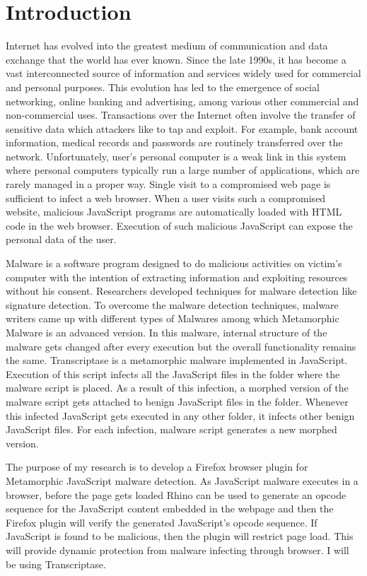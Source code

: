 \chapter{Introduction}

Internet has evolved into the greatest medium of communication and data exchange that the world has ever known. Since the late 1990s, it has become a vast interconnected source of information and services widely used for commercial and personal purposes. This evolution has led to the emergence of social networking, online banking and advertising, among various other commercial and non-commercial uses. Transactions over the Internet often involve the transfer of sensitive data which attackers like to tap and exploit. For example, bank account information, medical records and passwords are routinely transferred over the network. Unfortunately, user's personal computer is a weak link in this system where personal computers typically run a large number of applications, which are rarely managed in a proper way. Single visit to a compromised web page is sufficient to infect a web browser. When a user visits such a compromised website, malicious JavaScript programs are automatically loaded with HTML code in the web browser. Execution of such malicious JavaScript can expose the personal data of the user. 

Malware is a software program designed to do malicious activities on victim's computer with the intention of extracting information and exploiting resources without his consent. Researchers developed techniques for malware detection like signature detection. To overcome the malware detection techniques, malware writers came up with different types of Malwares among which Metamorphic Malware is an advanced version. In this malware, internal structure of the malware gets changed after every execution but the overall functionality remains the same. Transcriptase is a metamorphic malware implemented in JavaScript. Execution of this script infects all the JavaScript files in the folder where the malware script is placed. As a result of this infection, a morphed version of the malware script gets attached to benign JavaScript files in the folder. Whenever this infected JavaScript gets executed in any other folder, it infects other benign JavaScript files. For each infection, malware script generates a new morphed version.

The purpose of my research is to develop a Firefox browser plugin for Metamorphic JavaScript malware detection. As JavaScript malware executes in a browser, before the page gets loaded Rhino can be used to generate an opcode sequence for the JavaScript content embedded in the webpage and then the Firefox plugin will verify the generated JavaScript's opcode sequence. If JavaScript is found to be malicious, then the plugin will restrict page load. This will provide dynamic protection from malware infecting through browser. I will be using Transcriptase.

